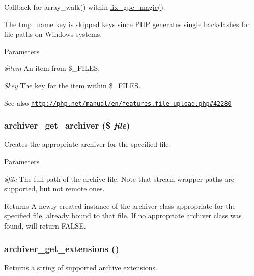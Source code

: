 Callback for array\_\-walk() within \hyperlink{common_8inc_abefb935bf3c61840ba9ad50adb13f766}{fix\_\-gpc\_\-magic()}.

The tmp\_\-name key is skipped keys since PHP generates single backslashes for file paths on Windows systems.


\begin{DoxyParams}{Parameters}
\item[{\em \$item}]An item from \$\_\-FILES. \item[{\em \$key}]The key for the item within \$\_\-FILES.\end{DoxyParams}
\begin{DoxySeeAlso}{See also}
\href{http://php.net/manual/en/features.file-upload.php#42280}{\tt http://php.net/manual/en/features.file-\/upload.php\#42280} 
\end{DoxySeeAlso}
\hypertarget{common_8inc_af2f29710c2fe37e69be6501bf833361b}{
\subsubsection[{archiver\_\-get\_\-archiver}]{\setlength{\rightskip}{0pt plus 5cm}archiver\_\-get\_\-archiver (\$ {\em file})}}
\label{common_8inc_af2f29710c2fe37e69be6501bf833361b}
Creates the appropriate archiver for the specified file.


\begin{DoxyParams}{Parameters}
\item[{\em \$file}]The full path of the archive file. Note that stream wrapper paths are supported, but not remote ones.\end{DoxyParams}
\begin{DoxyReturn}{Returns}
A newly created instance of the archiver class appropriate for the specified file, already bound to that file. If no appropriate archiver class was found, will return FALSE. 
\end{DoxyReturn}
\hypertarget{common_8inc_a18a577f5ca64b7ba483fc312e15d4d30}{
\subsubsection[{archiver\_\-get\_\-extensions}]{\setlength{\rightskip}{0pt plus 5cm}archiver\_\-get\_\-extensions ()}}
\label{common_8inc_a18a577f5ca64b7ba483fc312e15d4d30}
Returns a string of supported archive extensions.

